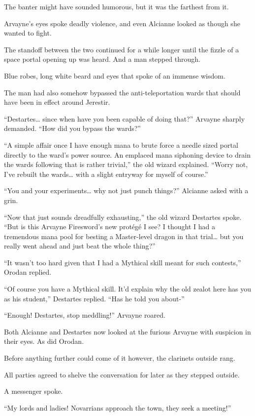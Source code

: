 \documentclass[a4paper,10pt]{book}
\begin{document}
The banter might have sounded humorous, but it was the farthest from it.\par
Arvayne’s eyes spoke deadly violence, and even Alcianne looked as though she wanted to fight.\par
The standoff between the two continued for a while longer until the fizzle of a space portal opening up was heard. And a man stepped through.\par
Blue robes, long white beard and eyes that spoke of an immense wisdom.\par
The man had also somehow bypassed the anti-teleportation wards that should have been in effect around Jerestir.\par
“Destartes… since when have you been capable of doing that?” Arvayne sharply demanded. “How did you bypass the wards?”\par
“A simple affair once I have enough mana to brute force a needle sized portal directly to the ward’s power source. An emplaced mana siphoning device to drain the wards following that is rather trivial,” the old wizard explained. “Worry not, I’ve rebuilt the wards… with a slight entryway for myself of course.”\par
“You and your experiments… why not just punch things?” Alcianne asked with a grin.\par
“Now that just sounds dreadfully exhausting,” the old wizard Destartes spoke. “But is this Arvayne Firesword’s new protégé I see? I thought I had a tremendous mana pool for besting a Master-level dragon in that trial… but you really went ahead and just beat the whole thing?”\par
“It wasn’t too hard given that I had a Mythical skill meant for such contests,” Orodan replied.\par
“Of course you have a Mythical skill. It’d explain why the old zealot here has you as his student,” Destartes replied. “Has he told you about-”\par
“Enough! Destartes, stop meddling!” Arvayne roared.\par
Both Alcianne and Destartes now looked at the furious Arvayne with suspicion in their eyes. As did Orodan.\par
Before anything further could come of it however, the clarinets outside rang.\par
All parties agreed to shelve the conversation for later as they stepped outside.\par
A messenger spoke.\par
“My lords and ladies! Novarrians approach the town, they seek a meeting!”\par
\end{document}
